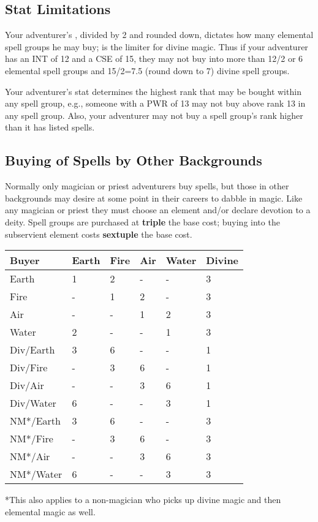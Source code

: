\begin{multicols*}{2}
\subsection{Stat Limitations}
Your adventurer's \INT, divided by 2 and rounded down, dictates how many elemental spell groups he may buy; \CSE is the limiter for divine magic. Thus if your adventurer has an INT of 12 and a CSE of 15, they may not buy into more than 12/2 or 6 elemental spell groups and 15/2=7.5 (round down to 7) divine spell groups.

Your adventurer's \PWR stat determines the highest rank that may be bought within any spell group, e.g., someone with a PWR of 13 may not buy above rank 13 in any spell group. Also, your adventurer may not buy a spell group's rank higher than it has listed spells.
\subsection{Buying of Spells by Other Backgrounds}
Normally only magician or priest adventurers buy spells, but those in other backgrounds may desire at some point in their careers to dabble in magic. Like any magician or priest they must choose an element and/or declare devotion to a deity. Spell groups are purchased at \textbf{triple} the base cost; buying into the subservient element costs \textbf{sextuple} the base cost.

\begin{normbox}
\begin{tabular}{l l l l l l}
\small
\textbf{Buyer} & \textbf{Earth}  & \textbf{Fire} & \textbf{Air} & \textbf{Water}  & \textbf{Divine}\\
\midrule
Earth & 1 & 2 & - & - & 3\\
Fire & - & 1 & 2 & - & 3\\
Air & - & - & 1 & 2 & 3\\
Water & 2 & - & - & 1 & 3\\
Div/Earth & 3 & 6 & - & - & 1\\
Div/Fire & - & 3 & 6 & - & 1\\
Div/Air & - & - & 3 & 6 & 1\\
Div/Water & 6 & - & - & 3 & 1\\
NM*/Earth & 3 & 6 & - & - & 3\\
NM*/Fire & - & 3 & 6 & - & 3\\
NM*/Air & - & - & 3 & 6 & 3\\
NM*/Water & 6 & - & - & 3 & 3\\
\end{tabular}
\end{normbox}
\normalsize
*This also applies to a non-magician who picks up divine magic and then elemental magic as well.


\end{multicols*}
